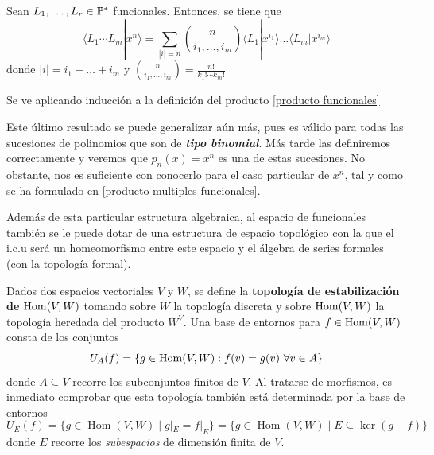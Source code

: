 \begin{proposicion}\label{producto multiples funcionales}
    Sean $L_1, \dots , L_r \in \mathbb{P}^*$ funcionales. Entonces, se tiene que
    \begin{equation*}
        \langle L_1 \cdots L_m | x^n \rangle = \sum_{|i|=n}\binom{n}{i_1, \dots , i_m} \langle L_1| x^{i_1} \rangle \dots  \langle L_m | x^{i_m} \rangle
    \end{equation*}
    donde $|i| = i_1 + \dots +i_m$ y $\binom{n}{i_1, \dots , i_m} = \frac{n!}{k_1! \cdots k_m!}$
\end{proposicion}
\begin{demo}
    Se ve aplicando inducción a la definición del producto \eqref{producto funcionales}
\end{demo}

\begin{obs}
    Este último resultado se puede generalizar aún más, pues es válido para todas las sucesiones de polinomios que son de \textit{\textbf{tipo binomial}}. Más tarde las definiremos correctamente y veremos que $p_n(x) = x^n$ es una de estas sucesiones. No obstante, nos es suficiente con conocerlo para el caso particular de $x^n$, tal y como se ha formulado en \ref{producto multiples funcionales}.
\end{obs}

Además de esta particular estructura algebraica, al espacio de funcionales también se le puede dotar de una estructura de espacio topológico con la que el i.c.u será un homeomorfismo entre este espacio y el álgebra de series formales (con la topología formal).
\begin{definicion}\label{topologia de estabilizacion}
Dados dos espacios vectoriales $V$ y $W$, se define la \textbf{topología de estabilización de} $\operatorname*{Hom}(V,W)$ tomando sobre $W$ la topología discreta y sobre $\operatorname*{Hom}(V,W)$ la topología heredada del producto $W^{V}$. Una base de entornos para $f \in \operatorname*{Hom}(V,W)$ consta de los conjuntos
\[
U_A(f) = \{ g \in \Hom(V, W) : f(v) = g(v) \ \forall v \in A\}
\]
donde $A \subseteq V$ recorre los subconjuntos finitos de $V$. Al tratarse de morfismos, es inmediato comprobar que esta topología también está determinada por la base de entornos
\[
U_E(f) = \{ g \in \operatorname{Hom}(V, W) \mid g|_E = f|_E \} = \{ g \in \operatorname{Hom}(V, W) \mid E \subseteq \ker(g - f) \}
\]
donde $E$ recorre los \emph{subespacios} de dimensión finita de $V$.


	
\end{definicion}

